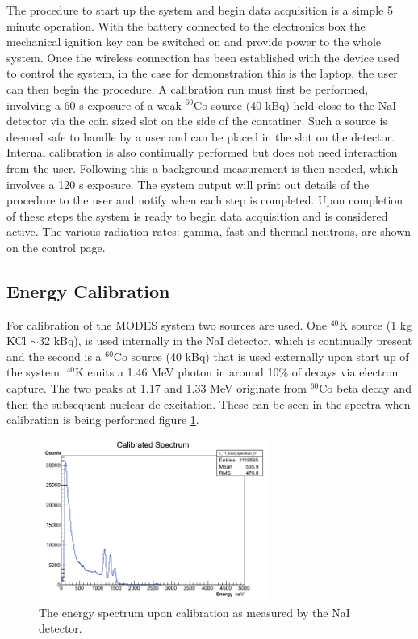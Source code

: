 The procedure to start up the system and begin data acquisition is a simple 5 minute operation. With the battery connected to the electronics box the mechanical ignition key can be switched on and provide power to the whole system. Once the wireless connection has been established with the device used to control the system, in the case for demonstration this is the laptop, the user can then begin the procedure. A calibration run must first be performed, involving a 60 s exposure of a weak $^{60}$Co source (40 kBq) held close to the NaI detector via the coin sized slot on the side of the contatiner. Such a source is deemed safe to handle by a user and can be placed in the slot on the detector. Internal calibration is also continually performed but does not need interaction from the user. Following this a background measurement is then needed, which involves a 120 s exposure. The system output will print out details of the procedure to the user and notify when each step is completed. Upon completion of these steps the system is ready to begin data acquisition and is considered active. The various radiation rates: gamma, fast and thermal neutrons, are shown on the control page. 

\subsection{Energy Calibration}
For calibration of the MODES system two sources are used. One $^{40}$K source (1 kg KCl $\sim$32 kBq), is used internally in the NaI detector, which is continually present and the second is a $^{60}$Co source (40 kBq) that is used externally upon start up of the system. $^{40}$K emits a 1.46 MeV photon in around 10\% of decays via electron capture. The two peaks at 1.17 and 1.33 MeV originate from $^{60}$Co beta decay and then the subsequent nuclear de-excitation. These can be seen in the spectra when calibration is being performed figure \ref{fig:calibrationSpectra}.

\begin{figure}
\begin{center}
\includegraphics[width=75mm]{./Chapter7/figures/co60GammaCalibration.png}
\end{center}
\caption{The energy spectrum upon calibration as measured by the NaI detector.}
\label{fig:calibrationSpectra}
\end{figure}

